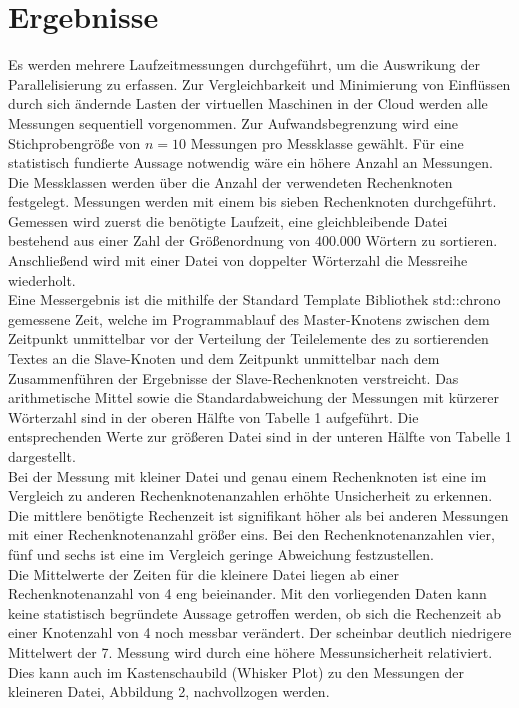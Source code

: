 \section{Ergebnisse}
Es werden mehrere Laufzeitmessungen durchgeführt, um die Auswrikung der Parallelisierung zu erfassen. Zur Vergleichbarkeit und Minimierung von Einflüssen durch sich ändernde Lasten der virtuellen Maschinen in der Cloud werden alle Messungen sequentiell vorgenommen. Zur Aufwandsbegrenzung wird eine Stichprobengröße von $n = 10$ Messungen pro Messklasse gewählt. Für eine statistisch fundierte Aussage notwendig wäre ein höhere Anzahl an Messungen. Die Messklassen werden über die Anzahl der verwendeten Rechenknoten festgelegt. Messungen werden mit einem bis sieben Rechenknoten durchgeführt. Gemessen wird zuerst die benötigte Laufzeit, eine gleichbleibende Datei bestehend aus einer Zahl der Größenordnung von $400.000$ Wörtern zu sortieren. Anschließend wird mit einer Datei von doppelter Wörterzahl die Messreihe wiederholt.
\\
Eine Messergebnis ist die mithilfe der Standard Template Bibliothek std::chrono gemessene Zeit, welche im Programmablauf des Master-Knotens zwischen dem Zeitpunkt unmittelbar vor der Verteilung der Teilelemente 
des zu sortierenden Textes an die Slave-Knoten und dem Zeitpunkt unmittelbar nach dem Zusammenführen der Ergebnisse der Slave-Rechenknoten verstreicht.
Das arithmetische Mittel sowie die Standardabweichung der Messungen mit kürzerer Wörterzahl sind in der oberen Hälfte von Tabelle 1 aufgeführt. Die entsprechenden Werte zur größeren Datei sind in der unteren Hälfte von Tabelle 1 dargestellt.
\\
Bei der Messung mit kleiner Datei und genau einem Rechenknoten ist eine im Vergleich zu anderen Rechenknotenanzahlen erhöhte Unsicherheit zu erkennen. Die mittlere benötigte Rechenzeit ist signifikant höher als bei anderen Messungen mit einer Rechenknotenanzahl größer eins. Bei den Rechenknotenanzahlen vier, fünf und sechs ist eine im Vergleich geringe Abweichung festzustellen.
\\
Die Mittelwerte der Zeiten für die kleinere Datei liegen ab einer Rechenknotenanzahl von 4 eng beieinander. Mit den vorliegenden Daten kann keine statistisch begründete Aussage getroffen werden, ob sich die Rechenzeit ab einer Knotenzahl von 4 noch messbar verändert. Der scheinbar deutlich niedrigere Mittelwert der 7. Messung wird durch eine höhere Messunsicherheit relativiert.
\\
Dies kann auch im Kastenschaubild (Whisker Plot) zu den Messungen der kleineren Datei, Abbildung 2, nachvollzogen werden.


